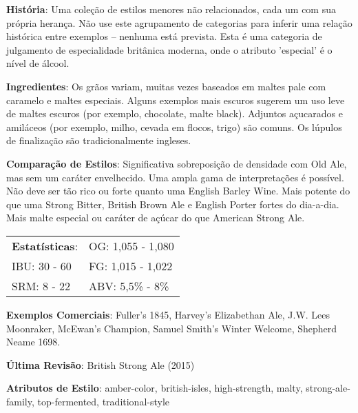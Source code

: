 \textbf{História}: Uma coleção de estilos menores não relacionados, cada um com sua própria herança. Não use este agrupamento de categorias para inferir uma relação histórica entre exemplos – nenhuma está prevista. Esta é uma categoria de julgamento de especialidade britânica moderna, onde o atributo 'especial' é o nível de álcool.

\textbf{Ingredientes}: Os grãos variam, muitas vezes baseados em maltes pale com caramelo e maltes especiais. Alguns exemplos mais escuros sugerem um uso leve de maltes escuros (por exemplo, chocolate, malte black). Adjuntos açucarados e amiláceos (por exemplo, milho, cevada em flocos, trigo) são comuns. Os lúpulos de finalização são tradicionalmente ingleses.

\textbf{Comparação de Estilos}: Significativa sobreposição de densidade com Old Ale, mas sem um caráter envelhecido. Uma ampla gama de interpretações é possível. Não deve ser tão rico ou forte quanto uma English Barley Wine. Mais potente do que uma Strong Bitter, British Brown Ale e English Porter fortes do dia-a-dia. Mais malte especial ou caráter de açúcar do que American Strong Ale.

\begin{tabular}{@{}p{35mm}p{35mm}@{}}
  \textbf{Estatísticas}: & OG: 1,055 - 1,080 \\
  IBU: 30 - 60  & FG: 1,015 - 1,022  \\
  SRM: 8 - 22  & ABV: 5,5\% - 8\%
\end{tabular}

\textbf{Exemplos Comerciais}: Fuller’s 1845, Harvey’s Elizabethan Ale, J.W. Lees Moonraker, McEwan’s Champion, Samuel Smith’s Winter Welcome, Shepherd Neame 1698.

\textbf{Última Revisão}: British Strong Ale (2015)

\textbf{Atributos de Estilo}: amber-color, british-isles, high-strength, malty, strong-ale-family, top-fermented, traditional-style
